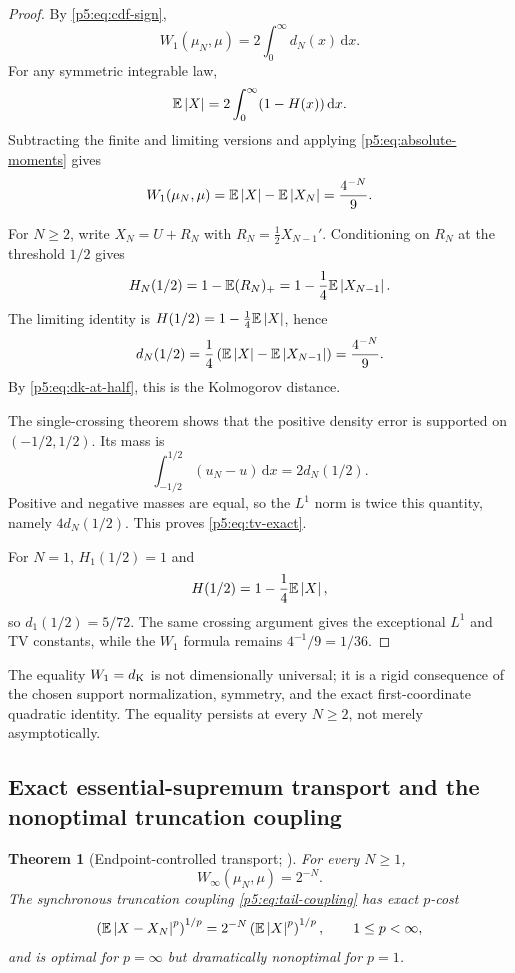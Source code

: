 \documentclass[11pt,oneside]{article}
\numberwithin{equation}{section}
\newtheorem{theorem}{Theorem}[section]
\theoremstyle{definition}
\theoremstyle{remark}
\newcommand{\E}{\mathbb E}
\newcommand{\dd}{\,\mathrm d}
\begin{document}
\begin{proof}
By \eqref{p5:eq:cdf-sign},
\[
 W_1(\mu_N,\mu)=2\int_0^\infty d_N(x)\dd x.
\]
For any symmetric integrable law,
\[
 \E\abs X=2\int_0^\infty(1-H(x))\dd x.
\]
Subtracting the finite and limiting versions and applying \eqref{p5:eq:absolute-moments} gives
\[
 W_1(\mu_N,\mu)=\E\abs X-\E\abs{X_N}=\frac{4^{-N}}9.
\]

For $N\ge2$, write $X_N=U+R_N$ with $R_N=\tfrac12X_{N-1}'$.  Conditioning on $R_N$ at the threshold $1/2$ gives
\[
 H_N(1/2)=1-\E(R_N)_+=1-\frac14\E\abs{X_{N-1}}.
\]
The limiting identity is $H(1/2)=1-\tfrac14\E\abs X$, hence
\[
 d_N(1/2)=\frac14\left(\E\abs X-\E\abs{X_{N-1}}\right)
 =\frac{4^{-N}}9.
\]
By \eqref{p5:eq:dk-at-half}, this is the Kolmogorov distance.

The single-crossing theorem shows that the positive density error is supported on $(-1/2,1/2)$.  Its mass is
\[
 \int_{-1/2}^{1/2}(u_N-u)\dd x
 =2d_N(1/2).
\]
Positive and negative masses are equal, so the $L^1$ norm is twice this quantity, namely $4d_N(1/2)$.  This proves \eqref{p5:eq:tv-exact}.

For $N=1$, $H_1(1/2)=1$ and
\[
 H(1/2)=1-\frac14\E\abs X,
\]
so $d_1(1/2)=5/72$.  The same crossing argument gives the exceptional $L^1$ and TV constants, while the $W_1$ formula remains $4^{-1}/9=1/36$.
\end{proof}

\begin{remark}
The equality $W_1=d_{\rm K}$ is not dimensionally universal; it is a rigid consequence of the chosen support normalization, symmetry, and the exact first-coordinate quadratic identity.  The equality persists at every $N\ge2$, not merely asymptotically.
\end{remark}

\subsection{Exact essential-supremum transport and the nonoptimal truncation coupling}

\begin{theorem}[Endpoint-controlled transport; \newresult]
For every $N\ge1$,
\begin{equation}
 \boxed{W_\infty(\mu_N,\mu)=2^{-N}.}
 \label{p5:eq:winfty}
\end{equation}
The synchronous truncation coupling \eqref{p5:eq:tail-coupling} has exact $p$-cost
\begin{equation}
 \left(\E\abs{X-X_N}^p\right)^{1/p}
 =2^{-N}\left(\E\abs X^p\right)^{1/p},
 \qquad 1\le p<\infty,
 \label{p5:eq:synchronous-cost}
\end{equation}
and is optimal for $p=\infty$ but dramatically nonoptimal for $p=1$.
\end{theorem}
\end{document}
